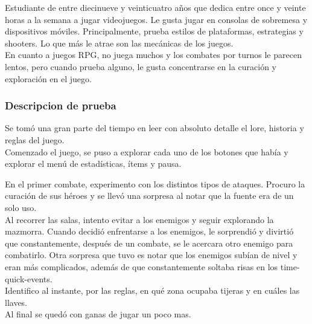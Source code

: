 Estudiante de entre diecinueve y veinticuatro años que dedica entre once y veinte horas a la semana a jugar videojuegos. Le gusta jugar en consolas de sobremesa y dispositivos móviles. Principalmente, prueba estilos de plataformas, estrategias y shooters. Lo que más le atrae son las mecánicas de los juegos.\\




En cuanto a juegos RPG, no juega muchos y los combates por turnos le parecen lentos, pero cuando prueba alguno, le gusta concentrarse en la curación y exploración en el juego.
\subsubsection{Descripcion de prueba}

Se tomó una gran parte del tiempo en leer con absoluto detalle el lore, historia y reglas del juego.\\




Comenzado el juego, se puso a explorar cada uno de los botones que había y explorar el menú de estadísticas, ítems y pausa.




En el primer combate, experimento con los distintos tipos de ataques. Procuro la curación de sus héroes y se llevó una sorpresa al notar que la fuente era de un solo uso.\\




Al recorrer las salas, intento evitar a los enemigos y seguir explorando la mazmorra. Cuando decidió enfrentarse a los enemigos, le sorprendió y divirtió que constantemente, después de un combate, se le acercara otro enemigo para combatirlo. Otra sorpresa que tuvo es notar que los enemigos subían de nivel y eran más complicados, además de que constantemente soltaba risas en los time-quick-events.\\




Identifico al instante, por las reglas, en qué zona ocupaba tijeras y en cuáles las llaves.\\




Al final se quedó con ganas de jugar un poco mas.\\


